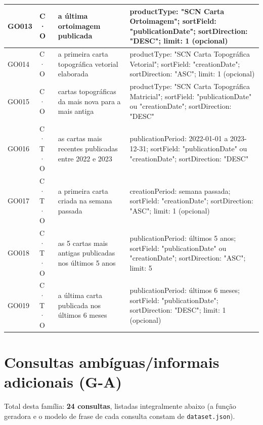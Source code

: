 {\begin{longtable}{|p{1.1cm}|p{1.3cm}|p{5.4cm}|p{6.3cm}|}
GO013 & C · O & a última ortoimagem publicada & productType: "SCN Carta Ortoimagem"; sortField: "publicationDate"; sortDirection: "DESC"; limit: 1 (opcional) \\ \hline
GO014 & C · O & a primeira carta topográfica vetorial elaborada & productType: "SCN Carta Topográfica Vetorial"; sortField: "creationDate"; sortDirection: "ASC"; limit: 1 (opcional) \\ \hline
GO015 & C · O & cartas topográficas da mais nova para a mais antiga & productType: "SCN Carta Topográfica Matricial"; sortField: "publicationDate" ou "creationDate"; sortDirection: "DESC" \\ \hline
GO016 & C · T · O & as cartas mais recentes publicadas entre 2022 e 2023 & publicationPeriod: 2022-01-01 a 2023-12-31; sortField: "publicationDate" ou "creationDate"; sortDirection: "DESC" \\ \hline
GO017 & C · T · O & a primeira carta criada na semana passada & creationPeriod: semana passada; sortField: "creationDate"; sortDirection: "ASC"; limit: 1 (opcional) \\ \hline
GO018 & C · T · O & as 5 cartas mais antigas publicadas nos últimos 5 anos & publicationPeriod: últimos 5 anos; sortField: "publicationDate" ou "creationDate"; sortDirection: "ASC"; limit: 5 \\ \hline
GO019 & C · T · O & a última carta publicada nos últimos 6 meses & publicationPeriod: últimos 6 meses; sortField: "publicationDate"; sortDirection: "DESC"; limit: 1 (opcional) \\ \hline
\end{longtable}
\addtocounter{table}{-1}
}

\section{Consultas amb\'iguas/informais adicionais (G-A)}

Total desta fam\'ilia: \textbf{24 consultas}, listadas integralmente abaixo (a fun\c{c}\~ao geradora e o modelo de frase de cada consulta constam de \texttt{dataset.json}).

